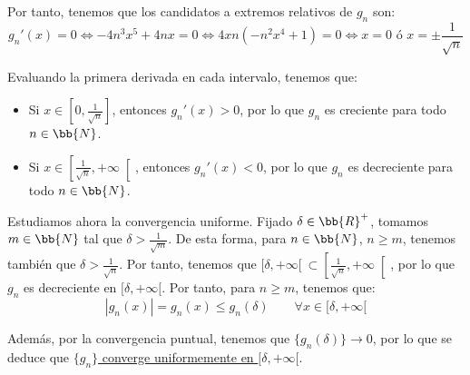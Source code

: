 \begin{ejercicio}
    Por tanto, tenemos que los candidatos a extremos relativos de $g_n$ son:
    \begin{equation*}
        g_n'(x) = 0 \iff -4n^3x^5+4nx = 0 \iff 4xn(-n^2x^4+1) = 0 \iff x = 0 \text{ ó } x =\pm \frac{1}{\sqrt{n}}
    \end{equation*}

    Evaluando la primera derivada en cada intervalo, tenemos que:
    \begin{itemize}
        \item Si $x\in \left[0,\frac{1}{\sqrt{n}}\right]$, entonces $g_n'(x) > 0$, por lo que $g_n$ es creciente para todo $n\in \bb{N}$.
        \item Si $x\in \left[\frac{1}{\sqrt{n}},+\infty\right[$, entonces $g_n'(x) < 0$, por lo que $g_n$ es decreciente para todo $n\in \bb{N}$.
    \end{itemize}
    
    Estudiamos ahora la convergencia uniforme. Fijado $\delta \in \bb{R}^+$,
    tomamos $m\in \bb{N}$ tal que $\delta > \frac{1}{\sqrt{m}}$. De esta forma,
    para $n\in \bb{N}$, $n\geq m$, tenemos también que $\delta > \frac{1}{\sqrt{n}}$. Por tanto,
    tenemos que $[\delta ,+\infty[~\subset \left[\frac{1}{\sqrt{n}},+\infty\right[$,
    por lo que $g_n$ es decreciente en $[\delta,+\infty[$. Por tanto, para $n\geq m$, tenemos que:
    \begin{equation*}
        |g_n(x)| = g_n(x) \leq g_n(\delta) \qquad \forall x\in [\delta,+\infty[
    \end{equation*}

    Además, por la convergencia puntual, tenemos que $\{g_n(\delta)\}\to 0$, por lo que se deduce que \ul{$\{g_n\}$ converge uniformemente en $[\delta,+\infty[$}.
\end{ejercicio}


